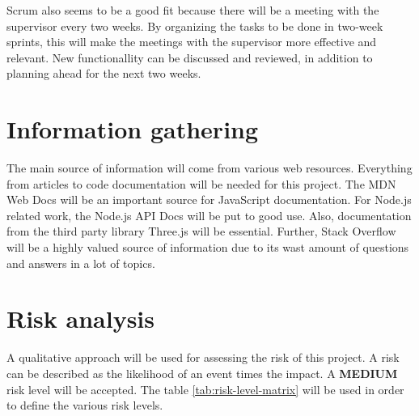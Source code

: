 Scrum also seems to be a good fit because there will be a meeting with the supervisor every two weeks. By organizing the tasks to be done in two-week sprints, this will make the meetings with the supervisor more effective and relevant. New functionallity can be discussed and reviewed, in addition to planning ahead for the next two weeks.

\section{Information gathering}
The main source of information will come from various web resources. Everything from articles to code documentation will be needed for this project. The MDN Web Docs \cite{mdn-web-docs} will be an important source for JavaScript documentation. For Node.js related work, the Node.js API Docs \cite{node.js-api-docs} will be put to good use. Also, documentation from the third party library Three.js \cite{three.js-docs} will be essential. Further, Stack Overflow \cite{stack-overflow} will be a highly valued source of information due to its wast amount of questions and answers in a lot of topics.

\section{Risk analysis}
A qualitative approach will be used for assessing the risk of this project. A risk can be described as the likelihood of an event times the impact. A \textbf{MEDIUM} risk level will be accepted.
The table \ref{tab:risk-level-matrix} will be used in order to define the various risk levels.


